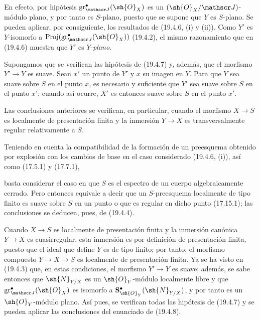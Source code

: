 En efecto, por hipótesis $\operatorname{gr}_{\mathscr J}^\bullet(\sh{O}_X)$ es un $(\sh{O}_X/\mathscr J)$-módulo plano, y por tanto es $S$-plano, puesto que se supone que $Y$ es $S$-plano. Se pueden aplicar, por consiguiente, los resultados de (19.4.6, (i) y (ii)). Como $Y'$ es $Y$-isomorfo a $\operatorname{Proj}(\operatorname{gr}_{\mathscr J}^\bullet(\sh{O}_X))$ (19.4.2), el mismo razonamiento que en (19.4.6) muestra que $Y'$ es $Y$-\emph{plano}.

\begin{proposition}[19.4.8]
\label{IV.19.4.8}
Supongamos que se verifican las hipótesis de \textup{(19.4.7)} y, además, que el morfismo $Y'\to Y$ es suave. Sean $x'$ un punto de $Y'$ y $x$ su imagen en $Y$. Para que $Y$ sea suave sobre $S$ en el punto $x$, es necesario y suficiente que $Y'$ sea suave sobre $S$ en el punto $x'$; cuando así ocurre, $X'$ es entonces suave sobre $S$ en el punto $x'$.

Las conclusiones anteriores se verifican, en particular, cuando el morfismo $X\to S$ es localmente de presentación finita y la inmersión $Y\to X$ es transversalmente regular relativamente a $S$.
\end{proposition}

Teniendo en cuenta la compatibilidad de la formación de un preesquema obtenido por explosión con los cambios de base en el caso considerado (19.4.6, (i)), así como (17.5.1) y (17.7.1),


basta considerar el caso en que $S$ es el espectro de un cuerpo algebraicamente cerrado. Pero entonces equivale a decir que un $S$-preesquema localmente de tipo finito es suave sobre $S$ en un punto o que es regular en dicho punto (17.15.1); las conclusiones se deducen, pues, de (19.4.4).

Cuando $X\to S$ es localmente de presentación finita y la inmersión canónica $Y\to X$ es cuasirregular, esta inmersión es por definición de presentación finita, puesto que el ideal que define $Y$ es de tipo finito; por tanto, el morfismo compuesto $Y\to X\to S$ es localmente de presentación finita. Ya se ha visto en (19.4.3) que, en estas condiciones, el morfismo $Y'\to Y$ es suave; además, se sabe entonces que $\sh{N}_{Y/X}$ es un $\sh{O}_Y$-módulo localmente libre y que $\operatorname{gr}_{\mathscr J}^\bullet(\sh{O}_X)$ es isomorfo a $\mathbf S_{\sh{O}_Y}^\bullet(\sh{N}_{Y/X})$, y por tanto es un $\sh{O}_Y$-módulo plano. Así pues, se verifican todas las hipótesis de (19.4.7) y se pueden aplicar las conclusiones del enunciado de (19.4.8).

